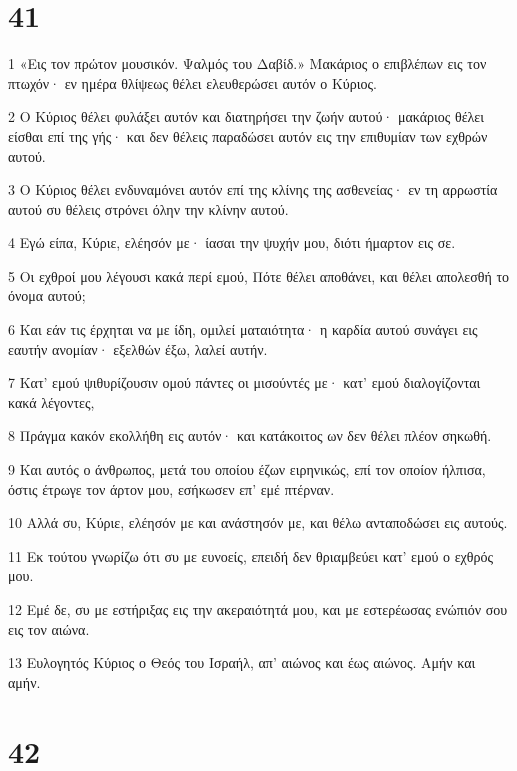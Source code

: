 \chapter{41}

\par 1 «Εις τον πρώτον μουσικόν. Ψαλμός του Δαβίδ.» Μακάριος ο επιβλέπων εις τον πτωχόν· εν ημέρα θλίψεως θέλει ελευθερώσει αυτόν ο Κύριος.
\par 2 Ο Κύριος θέλει φυλάξει αυτόν και διατηρήσει την ζωήν αυτού· μακάριος θέλει είσθαι επί της γής· και δεν θέλεις παραδώσει αυτόν εις την επιθυμίαν των εχθρών αυτού.
\par 3 Ο Κύριος θέλει ενδυναμόνει αυτόν επί της κλίνης της ασθενείας· εν τη αρρωστία αυτού συ θέλεις στρόνει όλην την κλίνην αυτού.
\par 4 Εγώ είπα, Κύριε, ελέησόν με· ίασαι την ψυχήν μου, διότι ήμαρτον εις σε.
\par 5 Οι εχθροί μου λέγουσι κακά περί εμού, Πότε θέλει αποθάνει, και θέλει απολεσθή το όνομα αυτού;
\par 6 Και εάν τις έρχηται να με ίδη, ομιλεί ματαιότητα· η καρδία αυτού συνάγει εις εαυτήν ανομίαν· εξελθών έξω, λαλεί αυτήν.
\par 7 Κατ' εμού ψιθυρίζουσιν ομού πάντες οι μισούντές με· κατ' εμού διαλογίζονται κακά λέγοντες,
\par 8 Πράγμα κακόν εκολλήθη εις αυτόν· και κατάκοιτος ων δεν θέλει πλέον σηκωθή.
\par 9 Και αυτός ο άνθρωπος, μετά του οποίου έζων ειρηνικώς, επί τον οποίον ήλπισα, όστις έτρωγε τον άρτον μου, εσήκωσεν επ' εμέ πτέρναν.
\par 10 Αλλά συ, Κύριε, ελέησόν με και ανάστησόν με, και θέλω ανταποδώσει εις αυτούς.
\par 11 Εκ τούτου γνωρίζω ότι συ με ευνοείς, επειδή δεν θριαμβεύει κατ' εμού ο εχθρός μου.
\par 12 Εμέ δε, συ με εστήριξας εις την ακεραιότητά μου, και με εστερέωσας ενώπιόν σου εις τον αιώνα.
\par 13 Ευλογητός Κύριος ο Θεός του Ισραήλ, απ' αιώνος και έως αιώνος. Αμήν και αμήν.

\chapter{42}

